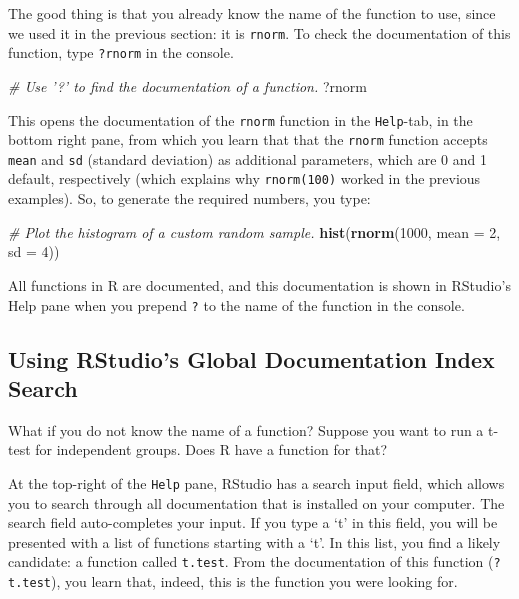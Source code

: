 \documentclass[]{book}
\newenvironment{Shaded}{\begin{snugshade}}{\end{snugshade}}
\newcommand{\KeywordTok}[1]{\textcolor[rgb]{0.13,0.29,0.53}{\textbf{#1}}}
\newcommand{\DataTypeTok}[1]{\textcolor[rgb]{0.13,0.29,0.53}{#1}}
\newcommand{\DecValTok}[1]{\textcolor[rgb]{0.00,0.00,0.81}{#1}}
\newcommand{\CommentTok}[1]{\textcolor[rgb]{0.56,0.35,0.01}{\textit{#1}}}
\newcommand{\NormalTok}[1]{#1}
\begin{document}
The good thing is that you already know the name of the function to use,
since we used it in the previous section: it is \texttt{rnorm}. To check
the documentation of this function, type \texttt{?rnorm} in the console.

\begin{Shaded}
\begin{Highlighting}[]
\CommentTok{# Use '?' to find the documentation of a function.}
\NormalTok{?rnorm}
\end{Highlighting}
\end{Shaded}

This opens the documentation of the \texttt{rnorm} function in the
\texttt{Help}-tab, in the bottom right pane, from which you learn that
that the \texttt{rnorm} function accepts \texttt{mean} and \texttt{sd}
(standard deviation) as additional parameters, which are 0 and 1
default, respectively (which explains why \texttt{rnorm(100)} worked in
the previous examples). So, to generate the required numbers, you type:

\begin{Shaded}
\begin{Highlighting}[]
\CommentTok{# Plot the histogram of a custom random sample.}
\KeywordTok{hist}\NormalTok{(}\KeywordTok{rnorm}\NormalTok{(}\DecValTok{1000}\NormalTok{, }\DataTypeTok{mean =} \DecValTok{2}\NormalTok{, }\DataTypeTok{sd =} \DecValTok{4}\NormalTok{))}
\end{Highlighting}
\end{Shaded}

All functions in R are documented, and this documentation is shown in
RStudio's Help pane when you prepend \texttt{?} to the name of the
function in the console.

\subsection{Using RStudio's Global Documentation Index
Search}\label{using-rstudios-global-documentation-index-search}

What if you do not know the name of a function? Suppose you want to run
a t-test for independent groups. Does R have a function for that?

At the top-right of the \texttt{Help} pane, RStudio has a search input
field, which allows you to search through all documentation that is
installed on your computer. The search field auto-completes your input.
If you type a `t' in this field, you will be presented with a list of
functions starting with a `t'. In this list, you find a likely
candidate: a function called \texttt{t.test}. From the documentation of
this function (\texttt{?t.test}), you learn that, indeed, this is the
function you were looking for.
\end{document}
